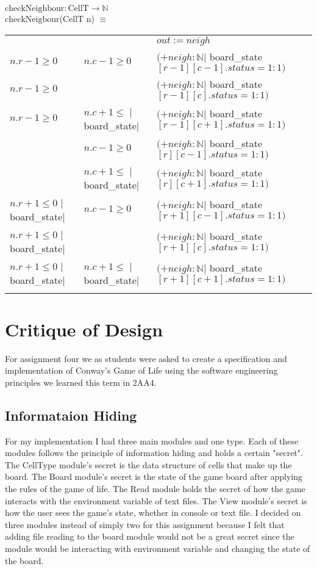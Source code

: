\documentclass[12pt]{article}
\begin{document}
\noindent $\text{checkNeighbour} : \text{CellT} \rightarrow \mathbb{N}$\\
\noindent
$\text{checkNeigbour}$(CellT n) $\equiv$ \\
\begin{tabular}{|l|l|l|}
	\hhline{~|~|-|}
	\multicolumn{1}{}{} & \multicolumn{1}{r|}{} & \multicolumn{1}{l|}{$out:= neigh$}\\
	\hhline{|-|-|-|}
	$n.r-1 \geq 0$  & $n.c-1 \geq 0$ & $(+ neigh: \mathbb{N} |$ board\_state$[r-1][c-1].status = 1 : 1)$ \\
	\hhline{|-|-|-|}
	$n.r-1 \geq 0$  & & $(+ neigh: \mathbb{N} |$ board\_state$[r-1][c].status = 1 : 1)$ \\ 
	\hhline{|-|-|-|}
	$n.r-1 \geq 0$  & $n.c+1 \leq $ $|$board\_state$|$ & $(+ neigh: \mathbb{N} |$ board\_state$[r-1][c+1].status = 1 : 1)$ \\
	\hhline{|-|-|-|}
	 & $n.c-1 \geq 0$  & $(+ neigh: \mathbb{N} |$ board\_state$[r][c-1].status = 1 : 1)$ \\
	\hhline{|-|-|-|}
	 & $n.c+1 \leq $ $|$board\_state$|$ & $(+ neigh: \mathbb{N} |$ board\_state$[r][c+1].status = 1 : 1)$ \\
	\hhline{|-|-|-|}
	$n.r+1 \leq 0$ $|$board\_state$|$ & $n.c-1 \geq 0$ & $(+ neigh: \mathbb{N} |$ board\_state$[r+1][c-1].status = 1 : 1)$ \\
	\hhline{|-|-|-|}
	$n.r+1 \leq 0$ $|$board\_state$|$ & & $(+ neigh: \mathbb{N} |$ board\_state$[r+1][c].status = 1 : 1)$ \\
	\hhline{|-|-|-|}
	$n.r+1 \leq 0$ $|$board\_state$|$ & $n.c+1 \leq $ $|$board\_state$|$ & $(+ neigh: \mathbb{N} |$ board\_state$[r+1][c+1].status = 1 : 1)$ \\
	\hhline{|-|-|-|}
\end{tabular}
\newpage

\section*{Critique of Design}
For assignment four we as students were asked to create a specification and implementation of Conway's Game of Life using the software engineering principles we learned this term in 2AA4. 

\subsection{Informataion Hiding}
For my implementation I had three main modules and one type. Each of these modules follows the principle of information hiding and holds a certain "secret". The CellType module's secret is the data structure of cells that make up the board. The Board module's secret is the state of the game board after applying the rules of the game of life. The Read module holds the secret of how the game interacts with the environment variable of text files. The View module's secret is how the user sees the game's state, whether in console or text file. I decided on three modules instead of simply two for this assignment because I felt that adding file reading to the board module would not be a great secret since the module would be interacting with environment variable and changing the state of the board. 
\end{document}
